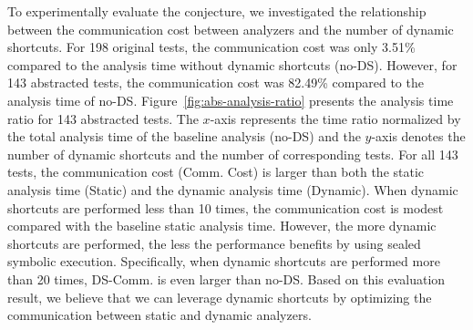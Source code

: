 To experimentally evaluate the conjecture, we investigated the relationship between
the communication cost between analyzers and the number of dynamic shortcuts.
For 198 original tests, the communication cost was only
3.51\% compared to the analysis time without dynamic shortcuts (no-DS).  However, for 143
abstracted tests, the communication cost was 82.49\% compared to the analysis
time of no-DS.  Figure~\ref{fig:abs-analysis-ratio} presents the
analysis time ratio for 143 abstracted tests.
The $x$-axis represents the time ratio normalized by the total analysis time of
the baseline analysis (no-DS) and the $y$-axis denotes the number of dynamic
shortcuts and the number of corresponding tests.
For all 143 tests, the communication cost (Comm. Cost) is larger than
both the static analysis time (Static) and the dynamic analysis
time (Dynamic).  When dynamic shortcuts are performed less than 10 times,
the communication cost is modest compared with the baseline static
analysis time.  However, the more dynamic shortcuts are performed,
the less the performance benefits by using sealed symbolic execution.
Specifically, when dynamic shortcuts are performed more than
20 times, DS-Comm. is even larger than no-DS.
Based on this evaluation result, we believe that we can leverage
dynamic shortcuts by optimizing the communication between static and dynamic analyzers.


